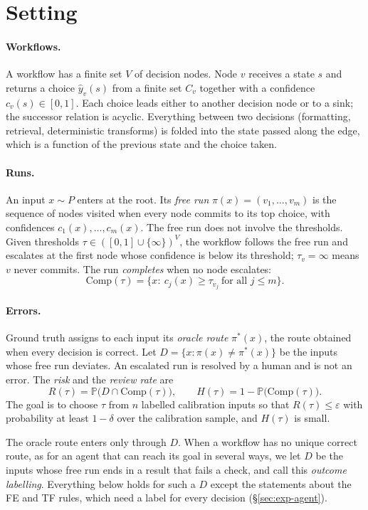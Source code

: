 \documentclass[11pt]{article}
\theoremstyle{definition}
\theoremstyle{remark}
\newcommand{\Prob}{\mathbb{P}}
\newcommand{\Comp}{\mathrm{Comp}}
\newcommand{\eps}{\varepsilon}
\begin{document}
\section{Setting}\label{sec:setting}

\paragraph{Workflows.} A workflow has a finite set $V$ of decision nodes. Node $v$ receives a
state $s$ and returns a choice $\hat y_v(s)$ from a finite set $C_v$ together with a confidence
$c_v(s)\in[0,1]$. Each choice leads either to another decision node or to a sink; the successor
relation is acyclic. Everything between two decisions (formatting, retrieval, deterministic
transforms) is folded into the state passed along the edge, which is a function of the
previous state and the choice taken.

\paragraph{Runs.} An input $x\sim P$ enters at the root. Its \emph{free run} $\pi(x) =
(v_1,\dots,v_m)$ is the sequence of nodes visited when every node commits to its top choice,
with confidences $c_1(x),\dots,c_m(x)$. The free run does not involve the thresholds. Given
thresholds $\tau\in([0,1]\cup\{\infty\})^V$, the workflow follows the free run and escalates at
the first node whose confidence is below its threshold; $\tau_v=\infty$ means $v$ never commits.
The run \emph{completes} when no node escalates:
\[
\Comp(\tau)=\bigl\{x:\ c_j(x)\ge\tau_{v_j}\ \text{for all } j\le m\bigr\}.
\]

\paragraph{Errors.} Ground truth assigns to each input its \emph{oracle route} $\pi^*(x)$, the
route obtained when every decision is correct. Let $D=\{x:\pi(x)\ne\pi^*(x)\}$ be the inputs
whose free run deviates. An escalated run is resolved by a human and is not an error. The
\emph{risk} and the \emph{review rate} are
\[
R(\tau)=\Prob\bigl(D\cap\Comp(\tau)\bigr),\qquad H(\tau)=1-\Prob\bigl(\Comp(\tau)\bigr).
\]
The goal is to choose $\tau$ from $n$ labelled calibration inputs so that $R(\tau)\le\eps$ with
probability at least $1-\delta$ over the calibration sample, and $H(\tau)$ is small.

The oracle route enters only through $D$. When a workflow has no unique correct route, as for
an agent that can reach its goal in several ways, we let $D$ be the inputs whose free run ends
in a result that fails a check, and call this \emph{outcome labelling}. Everything below holds
for such a $D$ except the statements about the FE and TF rules, which need a label for every
decision (\S\ref{sec:exp-agent}).
\end{document}
